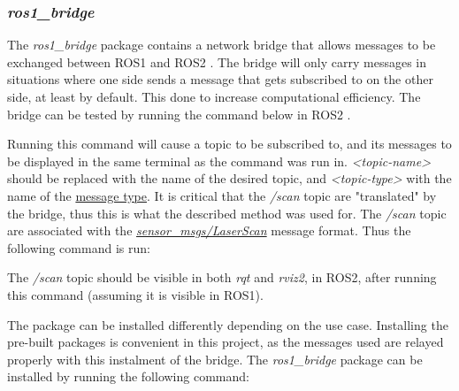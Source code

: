 \subsubsection{\textit{ros1\_bridge}}
The \textit{ros1\_bridge} package contains a network bridge that allows messages to be exchanged between ROS1 and ROS2 \cite{ros1_bridge}. The bridge will only carry messages in situations where one side sends a message that gets subscribed to on the other side, at least by default. This done to increase computational efficiency. The bridge can be tested by running the command below in ROS2 \cite{ros1_bridge}. 

\begin{tcolorbox}[width=\textwidth,colback={black},colupper=white, title={ubuntu terminal},colbacktitle=gray!125,coltitle=gray!50]\label{shell:echo}    
\end{tcolorbox}  

Running this command will cause a topic to be subscribed to, and its messages to be displayed in the same terminal as the command was run in. \textit{<topic-name>} should be replaced with the name of the desired topic, and \textit{<topic-type>} with the name of the \href{https://docs.ros.org/en/noetic/api/sensor_msgs/html/msg/}{message type}. It is critical that the \textit{/scan} topic are "translated" by the bridge, thus this is what the described method was used for. The \textit{/scan} topic are associated with the \href{https://docs.ros.org/en/noetic/api/sensor_msgs/html/msg/LaserScan.html}{\textit{sensor\_msgs/LaserScan}} message format. Thus the following command is run:

\begin{tcolorbox}[width=\textwidth,colback={black},colupper=white, title={ubuntu terminal},colbacktitle=gray!125,coltitle=gray!50]\label{shell:echo1}    
\end{tcolorbox} 

The \textit{/scan} topic should be visible in both \textit{rqt} and \textit{rviz2}, in ROS2, after running this command (assuming it is visible in ROS1). 

The package can be installed differently depending on the use case. Installing the pre-built packages is convenient in this project, as the messages used are relayed properly with this instalment of the bridge. The \textit{ros1\_bridge} package can be installed by running the following command: 

